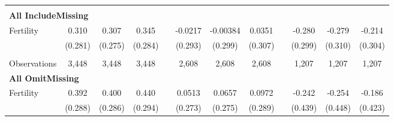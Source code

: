 \begin{landscape}
\begin{table}[htpb!]
\begin{center}
\begin{tabular}{lcccp{2mm}cccp{2mm}ccc}
\begin{footnotesize}\end{footnotesize}\\ 
\multicolumn{12}{l}{\textbf{All IncludeMissing}}\\ 
Fertility&0.310&0.307&0.345&&-0.0217&-0.00384&0.0351&&-0.280&-0.279&-0.214\\
&(0.281)&(0.275)&(0.284)&&(0.293)&(0.299)&(0.307)&&(0.299)&(0.310)&(0.304)\\
\begin{footnotesize}\end{footnotesize}&\begin{footnotesize}\end{footnotesize}&\begin{footnotesize}\end{footnotesize}&\begin{footnotesize}\end{footnotesize}&\begin{footnotesize}\end{footnotesize}&\begin{footnotesize}\end{footnotesize}&\begin{footnotesize}\end{footnotesize}&\begin{footnotesize}\end{footnotesize}&\begin{footnotesize}\end{footnotesize}&\begin{footnotesize}\end{footnotesize}&\begin{footnotesize}\end{footnotesize}&\begin{footnotesize}\end{footnotesize}\\Observations&3,448&3,448&3,448&&2,608&2,608&2,608&&1,207&1,207&1,207\\
\multicolumn{12}{l}{\textbf{All OmitMissing}}\\ 
Fertility&0.392&0.400&0.440&&0.0513&0.0657&0.0972&&-0.242&-0.254&-0.186\\
&(0.288)&(0.286)&(0.294)&&(0.273)&(0.275)&(0.289)&&(0.439)&(0.448)&(0.423)\\

\end{tabular}
\end{center}
\end{table}
\end{landscape}
